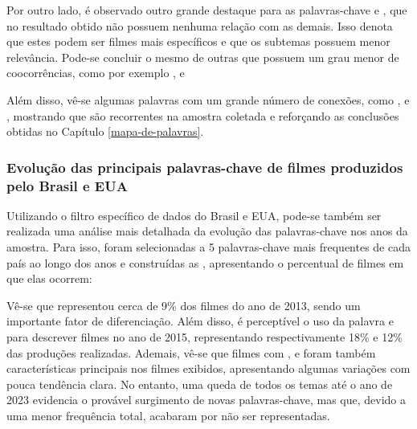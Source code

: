 Por outro lado, é observado outro grande destaque para as palavras-chave  e , que no resultado obtido não possuem nenhuma relação com as demais. Isso denota que estes podem ser filmes mais específicos e que os subtemas possuem menor relevância. Pode-se concluir o mesmo de outras que possuem um grau menor de coocorrências, como por exemplo ,  e 

Além disso, vê-se algumas palavras com um grande número de conexões, como ,  e , mostrando que são recorrentes na amostra coletada e reforçando as conclusões obtidas no Capítulo \ref{mapa-de-palavras}.

\subsubsection{Evolução das principais palavras-chave de filmes produzidos pelo Brasil e EUA}
Utilizando o filtro específico de dados do Brasil e EUA, pode-se também ser realizada uma análise mais detalhada da evolução das palavras-chave nos anos da amostra. Para isso, foram selecionadas a 5 palavras-chave mais frequentes de cada país ao longo dos anos e construídas as , apresentando o percentual de filmes em que elas ocorrem:

%

Vê-se que  representou cerca de 9\% dos filmes do ano de 2013, sendo um importante fator de diferenciação. Além disso, é perceptível o uso da palavra  e  para descrever filmes no ano de 2015, representando respectivamente 18\% e 12\% das produções realizadas. Ademais, vê-se que filmes com ,  e  foram também características principais nos filmes exibidos, apresentando algumas variações com pouca tendência clara. No entanto, uma queda de todos os temas até o ano de 2023 evidencia o provável surgimento de novas palavras-chave, mas que, devido a uma menor frequência total, acabaram por não ser representadas.

%

